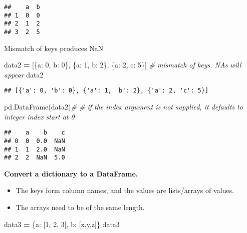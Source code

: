 \documentclass[
]{book}
\newenvironment{Shaded}{\begin{snugshade}}{\end{snugshade}}
\newcommand{\CommentTok}[1]{\textcolor[rgb]{0.56,0.35,0.01}{\textit{#1}}}
\newcommand{\DecValTok}[1]{\textcolor[rgb]{0.00,0.00,0.81}{#1}}
\newcommand{\NormalTok}[1]{#1}
\newcommand{\OperatorTok}[1]{\textcolor[rgb]{0.81,0.36,0.00}{\textbf{#1}}}
\newcommand{\StringTok}[1]{\textcolor[rgb]{0.31,0.60,0.02}{#1}}
\begin{document}
\begin{verbatim}
##    a  b
## 1  0  0
## 2  1  2
## 3  2  5
\end{verbatim}

Mismatch of keys produces NaN

\begin{Shaded}
\begin{Highlighting}[]
\NormalTok{data2 }\OperatorTok{=}\NormalTok{ [\{}\StringTok{\textquotesingle{}a\textquotesingle{}}\NormalTok{: }\DecValTok{0}\NormalTok{, }\StringTok{\textquotesingle{}b\textquotesingle{}}\NormalTok{: }\DecValTok{0}\NormalTok{\},}
\NormalTok{         \{}\StringTok{\textquotesingle{}a\textquotesingle{}}\NormalTok{: }\DecValTok{1}\NormalTok{, }\StringTok{\textquotesingle{}b\textquotesingle{}}\NormalTok{: }\DecValTok{2}\NormalTok{\},}
\NormalTok{         \{}\StringTok{\textquotesingle{}a\textquotesingle{}}\NormalTok{: }\DecValTok{2}\NormalTok{, }\StringTok{\textquotesingle{}c\textquotesingle{}}\NormalTok{: }\DecValTok{5}\NormalTok{\}] }\CommentTok{\# mismatch of keys. NAs will appear}
\NormalTok{data2}
\end{Highlighting}
\end{Shaded}

\begin{verbatim}
## [{'a': 0, 'b': 0}, {'a': 1, 'b': 2}, {'a': 2, 'c': 5}]
\end{verbatim}

\begin{Shaded}
\begin{Highlighting}[]
\NormalTok{pd.DataFrame(data2)}\CommentTok{\# \# if the index argument is not supplied, it defaults to integer index start at 0}
\end{Highlighting}
\end{Shaded}

\begin{verbatim}
##    a    b    c
## 0  0  0.0  NaN
## 1  1  2.0  NaN
## 2  2  NaN  5.0
\end{verbatim}

\textbf{Convert a dictionary to a DataFrame.}

\begin{itemize}
\item
  The keys form column names, and the values are lists/arrays of values.
\item
  The arrays need to be of the same length.
\end{itemize}

\begin{Shaded}
\begin{Highlighting}[]
\NormalTok{data3 }\OperatorTok{=}\NormalTok{ \{}\StringTok{\textquotesingle{}a\textquotesingle{}}\NormalTok{: [}\DecValTok{1}\NormalTok{, }\DecValTok{2}\NormalTok{, }\DecValTok{3}\NormalTok{], }\StringTok{\textquotesingle{}b\textquotesingle{}}\NormalTok{: [}\StringTok{\textquotesingle{}x\textquotesingle{}}\NormalTok{,}\StringTok{\textquotesingle{}y\textquotesingle{}}\NormalTok{,}\StringTok{\textquotesingle{}z\textquotesingle{}}\NormalTok{]\}}
\NormalTok{data3 }
\end{Highlighting}
\end{Shaded}
\end{document}
